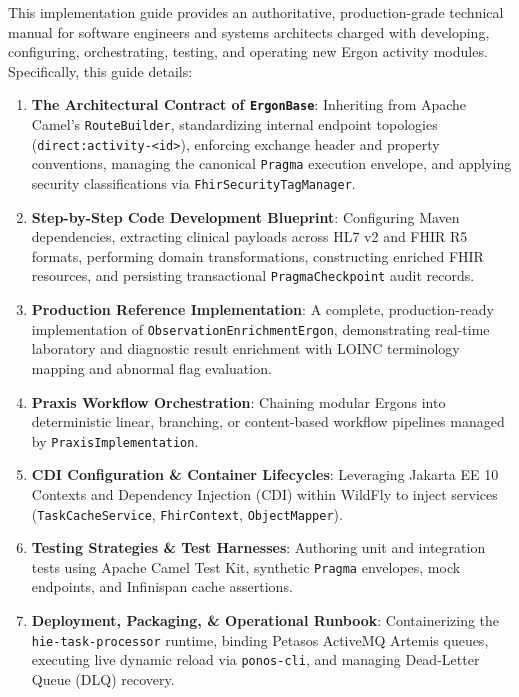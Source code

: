 This implementation guide provides an authoritative, production-grade technical manual for software engineers and systems architects charged with developing, configuring, orchestrating, testing, and operating new Ergon activity modules. Specifically, this guide details:
\begin{enumerate}
    \item \textbf{The Architectural Contract of \texttt{ErgonBase}}: Inheriting from Apache Camel's \texttt{RouteBuilder}, standardizing internal endpoint topologies (\texttt{direct:activity-<id>}), enforcing exchange header and property conventions, managing the canonical \texttt{Pragma} execution envelope, and applying security classifications via \texttt{FhirSecurityTagManager}.
    \item \textbf{Step-by-Step Code Development Blueprint}: Configuring Maven dependencies, extracting clinical payloads across HL7 v2 and FHIR R5 formats, performing domain transformations, constructing enriched FHIR resources, and persisting transactional \texttt{PragmaCheckpoint} audit records.
    \item \textbf{Production Reference Implementation}: A complete, production-ready implementation of \texttt{ObservationEnrichmentErgon}, demonstrating real-time laboratory and diagnostic result enrichment with LOINC terminology mapping and abnormal flag evaluation.
    \item \textbf{Praxis Workflow Orchestration}: Chaining modular Ergons into deterministic linear, branching, or content-based workflow pipelines managed by \texttt{PraxisImplementation}.
    \item \textbf{CDI Configuration \& Container Lifecycles}: Leveraging Jakarta EE 10 Contexts and Dependency Injection (CDI) within WildFly to inject services (\texttt{TaskCacheService}, \texttt{FhirContext}, \texttt{ObjectMapper}).
    \item \textbf{Testing Strategies \& Test Harnesses}: Authoring unit and integration tests using Apache Camel Test Kit, synthetic \texttt{Pragma} envelopes, mock endpoints, and Infinispan cache assertions.
    \item \textbf{Deployment, Packaging, \& Operational Runbook}: Containerizing the \texttt{hie-task-processor} runtime, binding Petasos ActiveMQ Artemis queues, executing live dynamic reload via \texttt{ponos-cli}, and managing Dead-Letter Queue (DLQ) recovery.
\end{enumerate}

